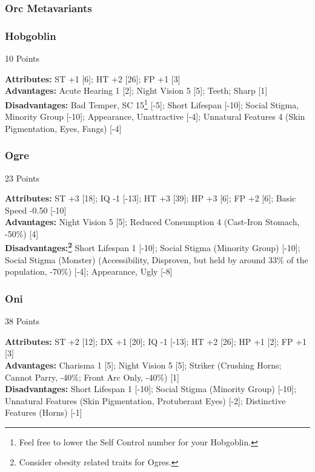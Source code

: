 \begin{multicols*}{3}
	\subsubsection{Orc Metavariants}
	
	\subsubsection*{Hobgoblin}
	\begin{flushright}
		10 Points
	\end{flushright}
	\textbf{Attributes:} 
	ST +1 [6]; HT +2 [26]; FP +1 [3]
	\\\textbf{Advantages:} 
	Acute Hearing 1 [2]; Night Vision 5 [5]; Teeth; Sharp [1]
	\\\textbf{Disadvantages:} 
	Bad Temper, SC 15\footnote{Feel free to lower the Self Control number for your Hobgoblin.} [-5]; Short Lifespan [-10]; Social Stigma, Minority Group [-10]; Appearance, Unattractive [-4]; Unnatural Features 4 (Skin Pigmentation, Eyes, Fangs) [-4]
	
	\subsubsection*{Ogre}
	\begin{flushright}
		23 Points
	\end{flushright}
	\textbf{Attributes:} 
	ST +3 [18]; IQ -1 [-13]; HT +3 [39]; HP +3 [6]; FP +2 [6]; Basic Speed -0.50 [-10]
	\\\textbf{Advantages:} 
	Night Vision 5 [5]; Reduced Consumption 4 (Cast-Iron Stomach, -50\%) [4]
	\\\textbf{Disadvantages:\footnote{Consider obesity related traits for Ogres.}} 
	Short Lifespan 1 [-10]; Social Stigma (Minority Group) [-10]; Social Stigma (Monster) (Accessibility, Disproven, but held by around 33\% of the population, -70\%) [-4]; Appearance, Ugly [-8]
	
	\subsubsection*{Oni}
	\begin{flushright}
		38 Points
	\end{flushright}
	\textbf{Attributes:} 
	ST +2 [12]; DX +1 [20]; IQ -1 [-13]; HT +2 [26]; HP +1 [2]; FP +1 [3]
	\\\textbf{Advantages:} 
	Charisma 1 [5]; Night Vision 5 [5]; Striker (Crushing Horns; Cannot Parry, -40\%; Front Arc Only, -40\%) [1]
	\\\textbf{Disadvantages:} 
	Short Lifespan 1 [-10]; Social Stigma (Minority Group) [-10]; Unnatural Features (Skin Pigmentation, Protuberant Eyes) [-2]; Distinctive Features (Horns) [-1]
	

\end{multicols*}
